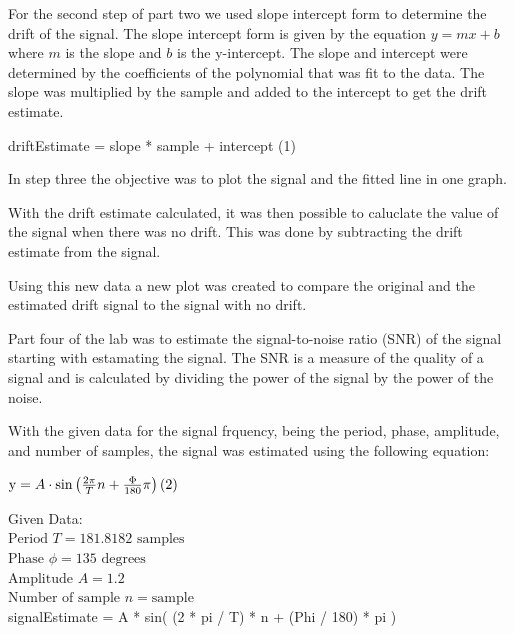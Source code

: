 \documentclass[journal]{IEEEtran}
\begin{document}
For the second step of part two we used slope intercept form to determine the drift of the signal. The slope intercept form is given by the equation $y = mx + b$ where $m$ is the slope and $b$ is the y-intercept. The slope and intercept were determined by the coefficients of the polynomial that was fit to the data. The slope was multiplied by the sample and added to the intercept to get the drift estimate.

\vspace{1em} %
\begin{raggedright}
    \noindent driftEstimate = slope * sample + intercept \hfill (1)
\end{raggedright}

\vspace{1em} %
In step three the objective was to plot the signal and the fitted line in one graph.

With the drift estimate calculated, it was then possible to caluclate the value of the signal when there was no drift. This was done by subtracting the drift estimate from the signal.

Using this new data a new plot was created to compare the original and the estimated drift signal to the signal with no drift.

Part four of the lab was to estimate the signal-to-noise ratio (SNR) of the signal starting with estamating the signal. The SNR is a measure of the quality of a signal and is calculated by dividing the power of the signal by the power of the noise.

With the given data for the signal frquency, being the period, phase, amplitude, and number of samples, the signal was estimated using the following equation:

\vspace{1em} %
\begin{raggedright}
    \noindent $\mathrm{y} = A \cdot \sin\left(\frac{2\pi}{T}n + \frac{\Phi}{180}\pi\right) \hfill (2)$

    \vspace{1em} %
    Given Data: \\
    \noindent $\text{Period } T = 181.8182 \text{ samples}$ \\
    \noindent $\text{Phase } \phi = 135 \text{ degrees}$ \\
    \noindent $\text{Amplitude } A = 1.2$ \\
    \noindent $\text{Number of sample } n = \text{sample}$ \\
    signalEstimate =  A * sin( (2 * pi / T) * n + (Phi / 180) * pi )
    
\end{raggedright}
\end{document}
